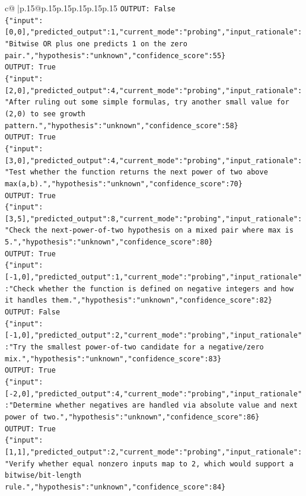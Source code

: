 \documentclass{article}
\begin{document}
{\begin{supertabular}{c@{$\;$}|p{.15\linewidth}@{}p{.15\linewidth}p{.15\linewidth}p{.15\linewidth}p{.15\linewidth}p{.15\linewidth}}
{{{\texttt{OUTPUT: False} \\
\texttt{\{"input":{[}0,0{]},"predicted\_output":1,"current\_mode":"probing","input\_rationale":"Bitwise OR plus one predicts 1 on the zero pair.","hypothesis":"unknown","confidence\_score":55\}} \\
\texttt{OUTPUT: True} \\
\texttt{\{"input":{[}2,0{]},"predicted\_output":4,"current\_mode":"probing","input\_rationale":"After ruling out some simple formulas, try another small value for (2,0) to see growth pattern.","hypothesis":"unknown","confidence\_score":58\}} \\
\texttt{OUTPUT: True} \\
\texttt{\{"input":{[}3,0{]},"predicted\_output":4,"current\_mode":"probing","input\_rationale":"Test whether the function returns the next power of two above max(a,b).","hypothesis":"unknown","confidence\_score":70\}} \\
\texttt{OUTPUT: True} \\
\texttt{\{"input":{[}3,5{]},"predicted\_output":8,"current\_mode":"probing","input\_rationale":"Check the next{-}power{-}of{-}two hypothesis on a mixed pair where max is 5.","hypothesis":"unknown","confidence\_score":80\}} \\
\texttt{OUTPUT: True} \\
\texttt{\{"input":{[}{-}1,0{]},"predicted\_output":1,"current\_mode":"probing","input\_rationale":"Check whether the function is defined on negative integers and how it handles them.","hypothesis":"unknown","confidence\_score":82\}} \\
\texttt{OUTPUT: False} \\
\texttt{\{"input":{[}{-}1,0{]},"predicted\_output":2,"current\_mode":"probing","input\_rationale":"Try the smallest power{-}of{-}two candidate for a negative/zero mix.","hypothesis":"unknown","confidence\_score":83\}} \\
\texttt{OUTPUT: True} \\
\texttt{\{"input":{[}{-}2,0{]},"predicted\_output":4,"current\_mode":"probing","input\_rationale":"Determine whether negatives are handled via absolute value and next power of two.","hypothesis":"unknown","confidence\_score":86\}} \\
\texttt{OUTPUT: True} \\
\texttt{\{"input":{[}1,1{]},"predicted\_output":2,"current\_mode":"probing","input\_rationale":"Verify whether equal nonzero inputs map to 2, which would support a bitwise/bit{-}length rule.","hypothesis":"unknown","confidence\_score":84\}} \\
}}}
\end{supertabular}}
\end{document}
